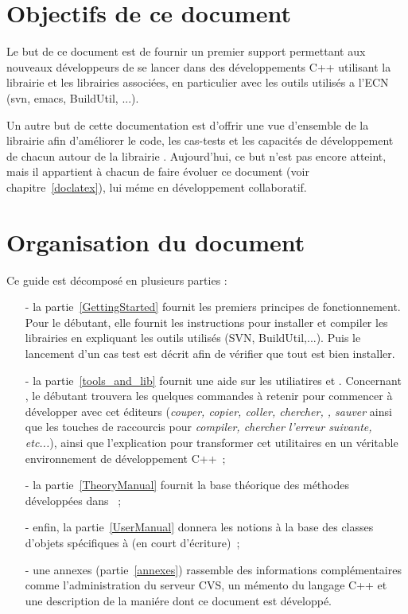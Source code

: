 \section*{Objectifs de ce document}
Le but de ce document est de  fournir un premier support permettant
aux nouveaux d\'eveloppeurs de se lancer dans des d\'eveloppements C++ 
utilisant la librairie  et les librairies associ\'ees, en particulier avec 
les outils utilis\'es a l'ECN (svn, emacs, BuildUtil, ...).

Un autre but de cette documentation est d'offrir une vue d'ensemble
de la librairie   afin d'am\'eliorer le code, les cas-tests
et les capacit\'es de d\'eveloppement de chacun autour de la librairie . 
Aujourd'hui, ce but n'est pas encore atteint, mais il appartient \`a chacun de faire \'evoluer 
ce document (voir chapitre~\ref{doclatex}), lui m\'eme en d\'eveloppement collaboratif.

\section*{Organisation du document}
Ce guide est d\'ecompos\'e en plusieurs parties :
\begin{itemize}
\item[-] la partie~\ref{GettingStarted} fournit les premiers principes de fonctionnement. Pour le d\'ebutant, elle fournit les instructions pour installer et compiler les librairies en expliquant les outils utilis\'es (SVN, BuildUtil,...). Puis le lancement d'un cas test est d\'ecrit afin de v\'erifier que tout est bien installer. 

\item[-] la partie~\ref{tools_and_lib} fournit une aide sur les utiliatires  et . Concernant , le d\'ebutant trouvera les quelques commandes \`a retenir pour commencer \`a d\'evelopper avec cet \'editeurs (\textit{couper, copier, coller, chercher, , sauver} ainsi que les touches de raccourcis pour \textit{compiler, chercher l'erreur suivante, etc...}), ainsi que l'explication pour transformer cet utilitaires en un v\'eritable environnement de d\'eveloppement C++~;

\item[-] la partie~\ref{TheoryManual} fournit la base th\'eorique des m\'ethodes d\'evelopp\'ees dans ~; 

\item[-] enfin, la partie~\ref{UserManual} donnera les notions \`a la base des classes  d'objets sp\'ecifiques \`a  (en court d'\'ecriture)~;

\item[-] une annexes (partie~\ref{annexes}) rassemble des informations compl\'ementaires comme l'administration du serveur CVS, un m\'emento du langage C++ et une description de la mani\'ere dont ce document est d\'evelopp\'e. 
\end{itemize}


